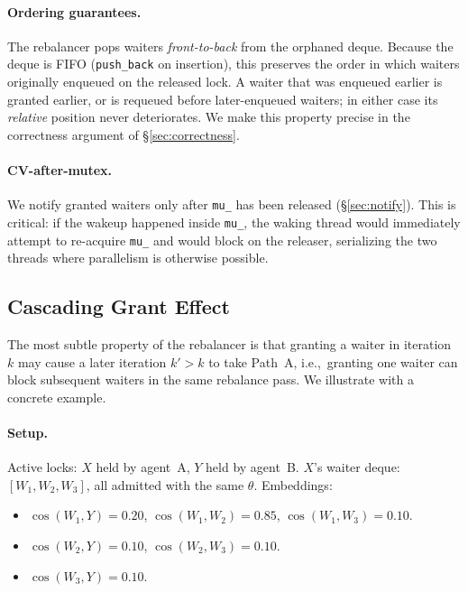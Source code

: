 \documentclass[sigconf]{acmart}
\begin{document}
\paragraph{\textbf{Ordering guarantees.}}
The rebalancer pops waiters \emph{front-to-back} from the orphaned
deque. Because the deque is FIFO (\texttt{push\_back} on insertion),
this preserves the order in which waiters originally enqueued on the
released lock. A waiter that was enqueued earlier is granted earlier,
or is requeued before later-enqueued waiters; in either case its
\emph{relative} position never deteriorates. We make this property
precise in the correctness argument of \S\ref{sec:correctness}.

\paragraph{\textbf{CV-after-mutex.}}
We notify granted waiters only after \texttt{mu\_} has been released
(\S\ref{sec:notify}). This is critical: if the wakeup happened inside
\texttt{mu\_}, the waking thread would immediately attempt to
re-acquire \texttt{mu\_} and would block on the releaser, serializing
the two threads where parallelism is otherwise possible.

\subsection{Cascading Grant Effect}
\label{sec:cascade}

The most subtle property of the rebalancer is that granting a waiter
in iteration~$k$ may cause a later iteration $k'>k$ to take Path~A,
i.e.,~granting one waiter can block subsequent waiters in the same
rebalance pass. We illustrate with a concrete example.

\paragraph{\textbf{Setup.}} Active locks: $X$ held by agent~A,
$Y$ held by agent~B. $X$'s waiter deque: $[W_1, W_2, W_3]$, all
admitted with the same $\theta$. Embeddings:

\begin{itemize}
\item $\cos(W_1,Y)=0.20$, $\cos(W_1,W_2)=0.85$, $\cos(W_1,W_3)=0.10$.
\item $\cos(W_2,Y)=0.10$, $\cos(W_2,W_3)=0.10$.
\item $\cos(W_3,Y)=0.10$.
\end{itemize}
\end{document}
